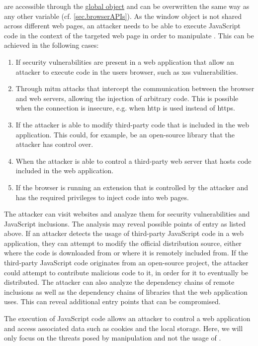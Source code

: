 \BrowserAPIs{} are accessible through the \hyperref[sec.globals]{global  object} and can be overwritten the same way as any other variable (cf. \autoref{sec.browserAPIs}). As the window object is not shared across different web pages, an attacker needs to be able to execute JavaScript code in the context of the targeted web page in order to manipulate \browserAPIs{}. This can be achieved in the following cases:

\begin{enumerate}
    \item If security vulnerabilities are present in a web application that allow an attacker to execute code in the users browser, such as \ac{xss} vulnerabilities.
    \item Through \ac{mitm} attacks that intercept the communication between the browser and web servers, allowing the injection of arbitrary code. This is possible when the connection is insecure, e.g. when \acs{http} is used instead of \acs{https}.
    \item If the attacker is able to modify third-party code that is included in the web application. This could, for example, be an open-source library that the attacker has control over.
    \item When the attacker is able to control a third-party web server that hosts code included in the web application.
    \item If the browser is running an extension that is controlled by the attacker and has the required privileges to inject code into web pages.
\end{enumerate}

The attacker can visit websites and analyze them for security vulnerabilities and JavaScript inclusions. The analysis may reveal possible points of entry as listed above. If an attacker detects the usage of third-party JavaScript code in a web application, they can attempt to modify the official distribution source, either where the code is downloaded from or where it is remotely included from. If the third-party JavaScript code originates from an open-source project, the attacker could attempt to contribute malicious code to it, in order for it to eventually be distributed. The attacker can also analyze the dependency chains of remote inclusions as well as the dependency chains of libraries that the web application uses. This can reveal additional entry points that can be compromised.

The execution of JavaScript code allows an attacker to control a web application and access associated data such as cookies and the local storage. Here, we will only focus on the threats posed by \browserAPI{} manipulation and not the usage of \browserAPIs{}.

